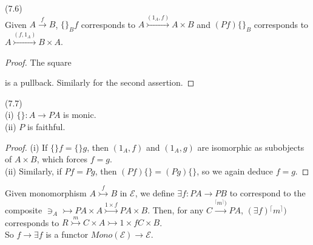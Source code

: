 \documentclass[a4paper]{article}
\begin{document}
\begin{lemma} (7.6)\\
    Given $A \xrightarrow{f} B$, $\{\}_B f$ corresponds to $A \stackrel{(1_A,f)}{\rightarrowtail} A \times B$ and $(Pf) \{\}_B$ corresponds to $A \stackrel{(f,1_A)}{\rightarrowtail} B \times A$.
    \begin{proof}
        The square
        

        is a pullback. Similarly for the second assertion.
    \end{proof}
\end{lemma}

\begin{coro} (7.7)\\
    (i) $\{\} : A \to PA$ is monic.\\
    (ii) $P$ is faithful.
    \begin{proof}
        (i) If $\{\} f = \{\} g$, then $(1_A,f)$ and $(1_A,g)$ are isomorphic as subobjects of $A \times B$, which forces $f=g$.\\
        (ii) Similarly, if $Pf = Pg$, then $(Pf)\{\} = (Pg)\{\}$, so we again deduce $f=g$.
    \end{proof}
\end{coro}

Given monomorphism $A \stackrel{f}{\rightarrowtail} B$ in $\mathcal{E}$, we define $\exists f:PA \to PB$ to correspond to the composite $\ni_A \rightarrowtail PA \times A \stackrel{1\times f}{\rightarrowtail} PA \times B$. Then, for any $C \xrightarrow{{}^{\lceil}m^\rceil)} PA$, $(\exists f) {}^{\lceil}m^\rceil)$ corresponds to $R \stackrel{m}{\rightarrowtail} C \times A \rightarrowtail{1 \times f} C \times B$.\\
So $f \to \exists f$ is a functor $Mono(\mathcal{E}) \to \mathcal{E}$.
\end{document}
